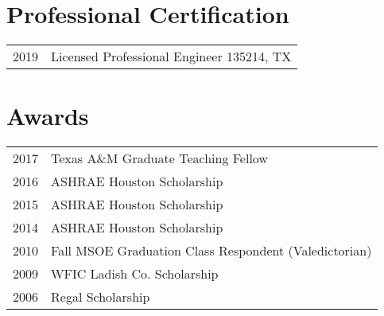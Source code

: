 \documentclass[]{deedy-resume-openfont}
\begin{document}
\begin{minipage}[t]{0.66\textwidth}


\section{Professional Certification}

\begin{tabular}{rl}
    2019 & Licensed Professional Engineer 135214, TX \\
\end{tabular}

\section{Awards}

\begin{tabular}{rl}
    2017 & Texas A\&M Graduate Teaching Fellow                   \\
    2016 & ASHRAE Houston Scholarship                            \\
    2015 & ASHRAE Houston Scholarship                            \\
    2014 & ASHRAE Houston Scholarship                            \\
    2010 & Fall MSOE Graduation Class Respondent (Valedictorian) \\
    2009 & WFIC Ladish Co. Scholarship                           \\
    2006 & Regal Scholarship                                     \\
\end{tabular}


\end{minipage}
\end{document}
